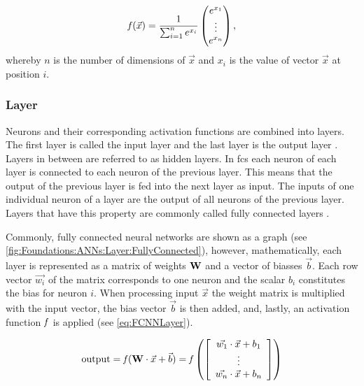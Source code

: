 \begin{equation}
\operatorname{\mathit{f}}(\vec{x}) = \frac{1}{\sum_{i = 1}^n e^{x_i}} 
    \begin{pmatrix}
        e^{x_1}\\
        \vdots \\
        e^{x_{n}}
    \end{pmatrix} \text{,}
\end{equation}
whereby $n$ is the number of dimensions of $\vec{x}$ and $x_i$ is the value of vector $\vec{x}$ at position $i$.   

\subsubsection{Layer}
\label{sec:Foundations:NeuralNetworks:Layer}

Neurons and their corresponding activation functions are combined into layers. The first layer is called the input layer and the last layer is the output layer \cite{nielsen2015neural}. Layers in between are referred to as hidden layers. In \acp{fc} each neuron of each layer is connected to each neuron of the previous layer. This means that the output of the previous layer is fed into the next layer as input. The inputs of one individual neuron of a layer are the output of all neurons of the previous layer. Layers that have this property are commonly called fully connected layers \cite{nielsen2015neural}. 

Commonly, fully connected neural networks are shown as a graph (see \autoref{fig:Foundations:ANNs:Layer:FullyConnected}), however, mathematically, each layer is represented as a matrix of weights $\mathbf{W}$ and a vector of biasses $\vec{b}$. Each row vector $\vec{w_i}$ of the matrix corresponds to one neuron and the scalar $b_i$ constitutes the bias for neuron $i$. When processing input $\vec{x}$ the weight matrix is multiplied with the input vector, the bias vector $\vec{b}$ is then added, and, lastly, an activation function $\operatorname{\mathit{f}}$ is applied (see \autoref{eq:FCNNLayer}).

\begin{equation}
    \label{eq:FCNNLayer}
    \mathrm{output} = \operatorname{\mathit{f}}(\mathbf{W} \cdot \vec{x} + \vec{b}) = \operatorname{\mathit{f}}
        \left( { 
            \left[ {
                \begin{array}{c}
                    \vec{w_1} \cdot \vec{x} + b_1\\
                    \vdots \\
                    \vec{w_n} \cdot \vec{x} + b_n
                \end{array} 
            } \right] 
        } \right)
\end{equation}

